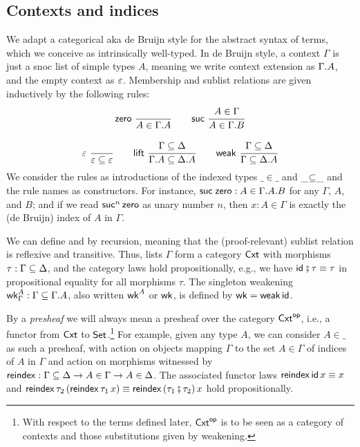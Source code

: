 \documentclass[sigplan,screen]{acmart}
\begin{document}
\subsection{Contexts and indices}

We adapt a categorical aka de Bruijn style for the abstract syntax of
terms, which we conceive as intrinsically well-typed.  In de Bruijn
style, a context $\Gamma$ is just a snoc list of simple types $A$,
meaning we write context extension as $\Gamma.A$, and the empty
context as $\varepsilon$.  Membership  and sublist
relations \fbox{$\Gamma \sublist \Delta$} are given inductively by the
following rules:
\begin{gather*}
  \nru{\tzero}{}{A \in \cext \Gamma A}
\qquad
  \nru{\tsuc}{A \in \Gamma}{A \in \cext \Gamma B}
\\[2ex]
  \nru{\tdone}{}{\cempty \sublist \cempty}
\qquad
  \nru{\tlift}
    {\Gamma \sublist \Delta}
    {\cext \Gamma A \sublist \cext \Delta A}
\qquad
  \nru{\tweak}
    {\Gamma \sublist \Delta}
    {\Gamma \sublist \cext \Delta A}
\end{gather*}
We consider the rules as introductions of the indexed types
$\_{\in}\_$ and $\_{\subseteq}\_$ and the rule names as constructors.
For instance, $\mathsf{\mathsf{suc}\;\mathsf{zero}} : A \in \Gamma.A.B$ for any
$\Gamma$, $A$, and $B$; and if we read $\mathsf{suc}^n\,\mathsf{zero}$ as unary
number $n$, then $x : A \in \Gamma$ is exactly the (de Bruijn) index
of $A$ in $\Gamma$.

We can define
\fbox{$\tid : \Gamma \sublist \Gamma$} and \fbox{$\_{\rcomp}\_ : \Gamma
\sublist \Delta \to \Delta \sublist \Phi \to \Gamma \sublist \Phi$}
by recursion, meaning that the (proof-relevant)
sublist relation is reflexive and transitive.
Thus, lists $\Gamma$ form a category
$\mathsf{Cxt}$ with morphisms $\tau : \Gamma \subseteq \Delta$, and the category laws
hold propositionally, e.g., we have $\mathsf{id}_{} \fatsemi \tau \equiv \tau$ in
propositional equality for all morphisms $\tau$.
The singleton weakening $\mathsf{wk}^A_\Gamma : \Gamma \subseteq \Gamma.A$,
also written $\mathsf{wk}^A$ or $\mathsf{wk}$, is defined by $\mathsf{wk} = \mathsf{weak}\,\mathsf{id}$.

By a \emph{presheaf} we will always mean a presheaf over the category $\mathsf{Cxt}^{\mathsf{op}}$,
i.e., a functor from $\mathsf{Cxt}$ to $\mathsf{Set}_{}$.\footnote{With respect to the terms
defined later, $\mathsf{Cxt}^{\mathsf{op}}$ is to be seen as a category of contexts and those
substitutions given by weakening.}  For example, given any type $A$, we can
consider $A{\in}\_$ as such a presheaf, with action on objects mapping $\Gamma$
to the set $A \in \Gamma$ of indices of $A$ in $\Gamma$ and action on morphisms
witnessed by $\mathsf{reindex} : \Gamma \subseteq \Delta \to A \in \Gamma \to A \in
\Delta$.  The associated functor laws $\mathsf{reindex}\,\mathsf{id}\,x \equiv x$ and
$\mathsf{reindex}\,\tau_2\,(\mathsf{reindex}\,\tau_1\,x) \equiv \mathsf{reindex}\,(\tau_1 \fatsemi
\tau_2)\,x$ hold propositionally.
\end{document}
